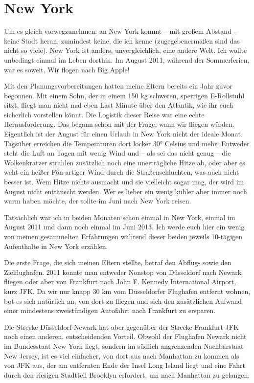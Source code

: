 \documentclass[fontsize=14pt,a4paper,headinclude,DIV=calc,automark]{scrbook}
\begin{document}
\section{New York}
\label{sec:new_york}

Um es gleich vorwegzunehmen: an New York kommt – mit großem Abstand – keine Stadt heran, zumindest keine, die ich kenne (zugegebenermaßen sind das nicht so viele). New York ist anders, unvergleichlich, eine andere Welt. Ich wollte unbedingt einmal im Leben dorthin. Im August 2011, während der Sommerferien, war es soweit. Wir flogen nach Big Apple!

Mit den Planungsvorbereitungen hatten meine Eltern bereits ein Jahr zuvor begonnen. Mit einem Sohn, der in einem 150 kg schweren, sperrigen E-Rollstuhl sitzt, fliegt man nicht mal eben Last Minute über den Atlantik, wie ihr euch sicherlich vorstellen könnt. Die Logistik dieser Reise war eine echte Herausforderung. Das begann schon mit der Frage, wann wir fliegen würden. Eigentlich ist der August für einen Urlaub in New York nicht der ideale Monat. Tagsüber erreichen die Temperaturen dort locker 30° Celsius und mehr. Entweder steht die Luft an Tagen mit wenig Wind und – als sei das nicht genug – die Wolkenkratzer strahlen zusätzlich noch eine unerträgliche Hitze ab, oder aber es weht ein heißer Fön-artiger Wind durch die Straßenschluchten, was auch nicht besser ist. Wem Hitze nichts ausmacht und sie vielleicht sogar mag, der wird im August nicht enttäuscht werden. Wer es lieber ein wenig kühler aber immer noch warm haben möchte, der sollte im Juni nach New York reisen.

Tatsächlich war ich in beiden Monaten schon einmal in New York, einmal im August 2011 und dann noch einmal im Juni 2013. Ich werde euch hier ein wenig von meinen gesammelten Erfahrungen während dieser beiden jeweils 10-tägigen Aufenthalte in New York erzählen.

Die erste Frage, die sich meinen Eltern stellte, betraf den Abflug- sowie den Zielflughafen. 2011 konnte man entweder Nonstop von Düsseldorf nach Newark fliegen oder aber von Frankfurt nach John F. Kennedy International Airport, kurz JFK. Da wir nur knapp 30 km vom Düsseldorfer Flughafen entfernt wohnen, bot es sich natürlich an, von dort zu fliegen und sich den zusätzlichen Aufwand einer mindestens zweistündigen Autofahrt nach Frankfurt zu ersparen.

Die Strecke Düsseldorf-Newark hat aber gegenüber der Strecke Frankfurt-JFK noch einen anderen, entscheidenden Vorteil. Obwohl der Flughafen Newark nicht im Bundesstaat New York liegt, sondern im südlich angrenzenden Nachbarstaat New Jersey, ist es viel einfacher, von dort aus nach Manhattan zu kommen als von JFK aus, der am entfernten Ende der Insel Long Island liegt und eine Fahrt durch den riesigen Stadtteil Brooklyn erfordert, um nach Manhattan zu gelangen.
\end{document}
